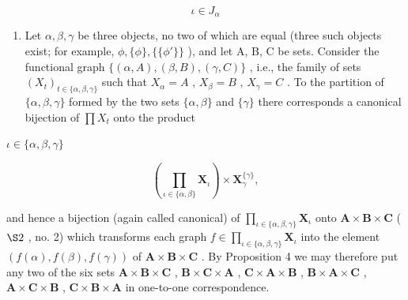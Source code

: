 \[
\iota \in J _ {\alpha}
\]

\begin{enumerate}
\def\labelenumi{(\arabic{enumi})}
\setcounter{enumi}{1}
\tightlist
\item
  Let \(\alpha, \beta, \gamma\) be three objects, no two of which are equal (three such objects exist; for example, \(\phi, \{\phi\}, \{\{\phi'\}\}\) ), and let A, B, C be sets. Consider the functional graph \(\{(\alpha, A), (\beta, B), (\gamma, C)\}\) , i.e., the family of sets \((X_{t})_{t \in \{\alpha, \beta, \gamma\}}\) such that \(X_{\alpha} = A\) , \(X_{\beta} = B\) , \(X_{\gamma} = C\) . To the partition of \(\{\alpha, \beta, \gamma\}\) formed by the two sets \(\{\alpha, \beta\}\) and \(\{\gamma\}\) there corresponds a canonical bijection of \(\prod X_{t}\) onto the product
\end{enumerate}

\(\iota \in \{\alpha, \beta, \gamma\}\)

\[
\left(\prod_ {\iota \in \{\alpha , \beta \}} \mathbf {X} _ {\iota}\right) \times \mathbf {X} _ {\gamma} ^ {\{\gamma \}},
\]

and hence a bijection (again called canonical) of \(\prod_{\iota \in \{\alpha, \beta, \gamma\}} \mathbf{X}_{\iota}\) onto \(\mathbf{A} \times \mathbf{B} \times \mathbf{C}\) ( \(\S 2\) , no. 2) which transforms each graph \(f \in \prod_{\iota \in \{\alpha, \beta, \gamma\}} \mathbf{X}_{\iota}\) into the element \((f(\alpha), f(\beta), f(\gamma))\) of \(\mathbf{A} \times \mathbf{B} \times \mathbf{C}\) . By Proposition 4 we may therefore put any two of the six sets \(\mathbf{A} \times \mathbf{B} \times \mathbf{C}\) , \(\mathbf{B} \times \mathbf{C} \times \mathbf{A}\) , \(\mathbf{C} \times \mathbf{A} \times \mathbf{B}\) , \(\mathbf{B} \times \mathbf{A} \times \mathbf{C}\) , \(\mathbf{A} \times \mathbf{C} \times \mathbf{B}\) , \(\mathbf{C} \times \mathbf{B} \times \mathbf{A}\) in one-to-one correspondence.

